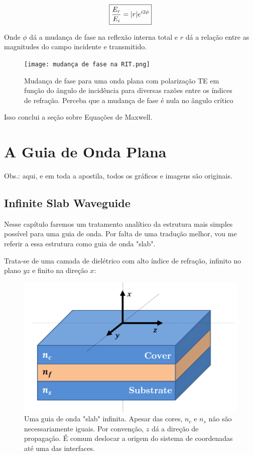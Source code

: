 \documentclass[12pt,a4paper]{report}
\begin{document}
\begin{equation*}
    \boxed{\frac{E_r}{E_i}=\abs{r}e^{i2\phi}}
\end{equation*}

Onde $\phi$ dá a mudança de fase na reflexão interna total e $r$ dá a relação entre as magnitudes do campo incidente e transmitido.

\begin{figure}[H]
    \centering
    \texttt{[image: mudança de fase na RIT.png]}
    \caption{Mudança de fase para uma onda plana com polarização TE em função do ângulo de incidência para diversas razões entre os índices de refração. Perceba que a mudança de fase é nula no ângulo crítico}
    \label{fase.na.rit}
\end{figure}


Isso conclui a seção sobre Equações de Maxwell.\pagebreak

\section{A Guia de Onda Plana}

Obs.: aqui, e em toda a apostila, todos os gráficos e imagens são originais.

\subsection{Infinite Slab Waveguide}

Nesse capítulo faremos um tratamento analítico da estrutura mais simples possível para uma guia de onda. Por falta de uma tradução melhor, vou me referir a essa estrutura como guia de onda "slab".

Trata-se de uma camada de dielétrico com alto índice de refração, infinito no plano $yz$ e finito na direção $x$:

\begin{figure}[H]
    \centering
    \includegraphics[width=1\linewidth]{Infinite Slab Waveguide.png}
    \caption{Uma guia de onda "slab" infinita. Apesar das cores, $n_c$ e $n_s$ não são necessariamente iguais. Por convenção, $z$ dá a direção de propagação. É comum deslocar a origem do sistema de coordenadas até uma das interfaces.}
    \label{slab.waveguide}
\end{figure}
\end{document}
